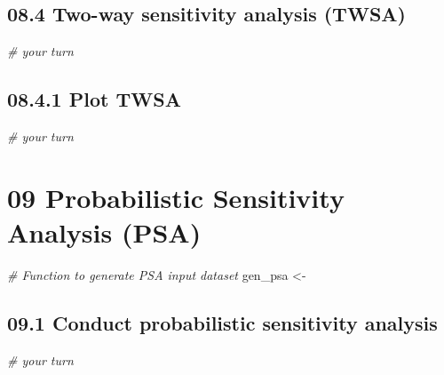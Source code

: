\documentclass[
]{article}
\newenvironment{Shaded}{\begin{snugshade}}{\end{snugshade}}
\newcommand{\CommentTok}[1]{\textcolor[rgb]{0.56,0.35,0.01}{\textit{#1}}}
\newcommand{\NormalTok}[1]{#1}
\newcommand{\StringTok}[1]{\textcolor[rgb]{0.31,0.60,0.02}{#1}}
\begin{document}
\hypertarget{two-way-sensitivity-analysis-twsa}{%
\subsection{08.4 Two-way sensitivity analysis
(TWSA)}\label{two-way-sensitivity-analysis-twsa}}

\begin{Shaded}
\begin{Highlighting}[]
\CommentTok{# your turn}
\end{Highlighting}
\end{Shaded}

\hypertarget{plot-twsa}{%
\subsection{08.4.1 Plot TWSA}\label{plot-twsa}}

\begin{Shaded}
\begin{Highlighting}[]
\CommentTok{# your turn}
\end{Highlighting}
\end{Shaded}

\hypertarget{probabilistic-sensitivity-analysis-psa}{%
\section{09 Probabilistic Sensitivity Analysis
(PSA)}\label{probabilistic-sensitivity-analysis-psa}}

\begin{Shaded}
\begin{Highlighting}[]
\CommentTok{# Function to generate PSA input dataset}
\NormalTok{gen_psa <-}\StringTok{ }
\end{Highlighting}
\end{Shaded}

\hypertarget{conduct-probabilistic-sensitivity-analysis}{%
\subsection{09.1 Conduct probabilistic sensitivity
analysis}\label{conduct-probabilistic-sensitivity-analysis}}

\begin{Shaded}
\begin{Highlighting}[]
\CommentTok{# your turn}
\end{Highlighting}
\end{Shaded}
\end{document}

